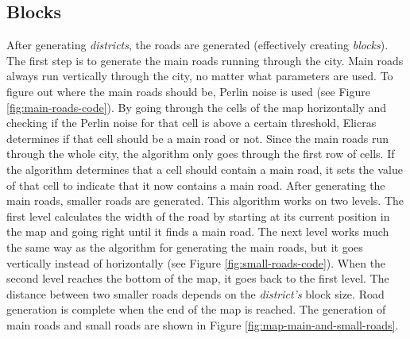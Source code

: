 	\subsection{Blocks}
	After generating \textit{districts}, the roads are generated (effectively creating \textit{blocks}). The first step is to generate the main roads running through the city. Main roads always run vertically through the city, no matter what parameters are used. To figure out where the main roads should be, Perlin noise is used (see Figure \ref{fig:main-roads-code}). By going through the cells of the map horizontally and checking if the Perlin noise for that cell is above a certain threshold, Elicras determines if that cell should be a main road or not. Since the main roads run through the whole city, the algorithm only goes through the first row of cells. If the algorithm determines that a cell should contain a main road, it sets the value of that cell to indicate that it now contains a main road. After generating the main roads, smaller roads are generated. This algorithm works on two levels. The first level calculates the width of the road by starting at its current position in the map and going right until it finds a main road. The next level works much the same way as the algorithm for generating the main roads, but it goes vertically instead of horizontally (see Figure \ref{fig:small-roads-code}). When the second level reaches the bottom of the map, it goes back to the first level. The distance between two smaller roads depends on the \textit{district's} block size. Road generation is complete when the end of the map is reached. The generation of main roads and small roads are shown in Figure \ref{fig:map-main-and-small-roads}.
	
